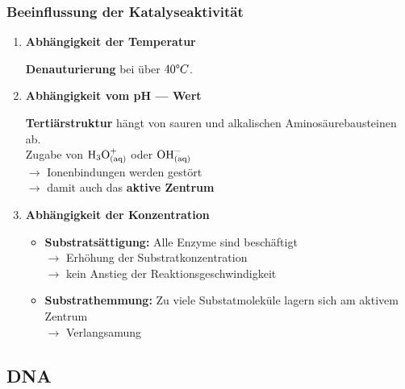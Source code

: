 \documentclass[a4paper, 12pt]{scrartcl}
\begin{document}
\subsubsection{Beeinflussung der Katalyseaktivität}
\begin{enumerate}
    \item \textbf{Abhängigkeit der Temperatur}

        \textbf{Denauturierung} bei über $40\degree C$.

    \item \textbf{Abhängigkeit vom pH --- Wert}

        \textbf{Tertiärstruktur} hängt von sauren und alkalischen
        Aminosäurebausteinen ab. \\
        Zugabe von $\ce{H3O^{+}_{(aq)}}$ oder $\ce{OH^{-}_{(aq)}}$ \\
        $\rightarrow$ Ionenbindungen werden gestört \\
        $ \rightarrow$ damit auch das \textbf{aktive Zentrum}

    \item \textbf{Abhängigkeit der Konzentration}

        \begin{itemize}
            \item \textbf{Substratsättigung:} Alle Enzyme sind beschäftigt \\
                $\rightarrow$ Erhöhung der Substratkonzentration \\
                $ \rightarrow$ kein Anstieg der Reaktionsgeschwindigkeit
            \item \textbf{Substrathemmung:} Zu viele Substatmoleküle lagern sich
                am aktivem Zentrum \\
                $ \rightarrow$ Verlangsamung
        \end{itemize}
\end{enumerate}
\subsection{DNA}
\end{document}
